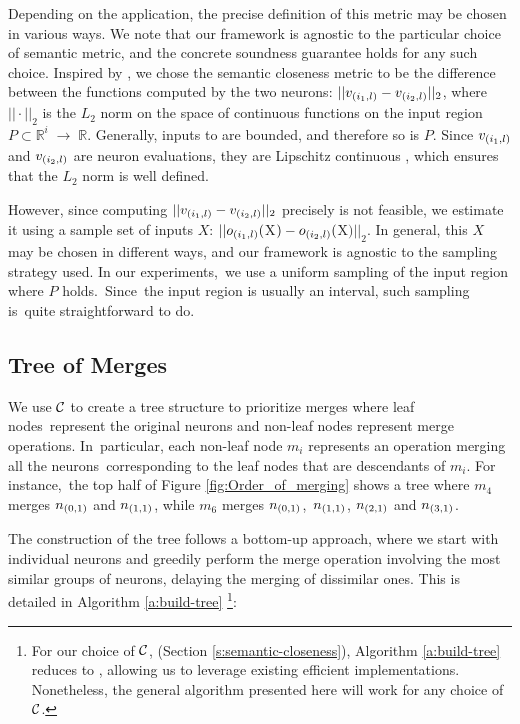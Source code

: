 Depending on the application, the precise definition of this metric may be chosen in various ways. We note that our framework is agnostic to the particular choice of semantic metric, and the concrete soundness guarantee holds for any such choice. Inspired by \cite{deep-abstract}, we chose the
semantic closeness metric to be the difference between the functions computed by the two neurons: $||v_{(i_1,l)} - v_{(i_2,l)}||_2$, where $|| \cdot ||_2$ is the $L_2$ norm on the space of continuous functions on the input region $P \subset \mathbb{R}^i \;{\rightarrow}\; \mathbb{R}$. Generally, inputs to \dnn are bounded, and therefore so is $P$. Since $v_{(i_1,l)}$ and $v_{(i_2,l)}$ are neuron evaluations, they are Lipschitz continuous \cite{nn-lipschitz}, which ensures that the $L_2$ norm is
well defined.




However, since computing $||v_{(i_1,l)} - v_{(i_2,l)}||_2$ precisely is not feasible, we estimate it using a sample set of inputs $X$: $||o_{(i_1,l)}($X$) - o_{(i_2,l)}($X$)||_2$. In general, this $X$ may be chosen in different ways, and our framework is agnostic to the sampling strategy used. In our experiments, we use a uniform sampling of the input region where $P$ holds. Since the input region is usually an interval, such sampling is quite straightforward to do.




\subsection{Tree of Merges}
\label{s:tree}




We use $\mathcal{C}$ to create a tree structure to prioritize merges where leaf nodes represent the original neurons and non-leaf nodes represent merge operations. In particular, each non-leaf node $m_i$ represents an operation merging all the neurons corresponding to the leaf nodes that are descendants of $m_i$. For instance, the top half of Figure \ref{fig:Order_of_merging} shows a tree where $m_4$
merges $n_{(0,1)}$ and $n_{(1,1)}$, while $m_6$ merges $n_{(0,1)}$, $n_{(1,1)}$, $n_{(2,1)}$ and $n_{(3,1)}$.




The construction of the tree follows a bottom-up approach, where we start with individual neurons and greedily perform the merge operation involving the most similar groups of neurons, delaying the merging of dissimilar ones. This is detailed in Algorithm \ref{a:build-tree} \footnote{For our choice of $\mathcal{C}$, (Section \ref{s:semantic-closeness}), Algorithm \ref{a:build-tree} reduces to \hcluster, allowing us to leverage existing efficient implementations. Nonetheless, the general algorithm presented here will work for any choice of $\mathcal{C}$.}:




